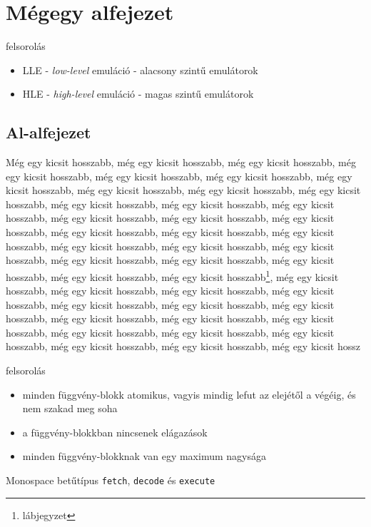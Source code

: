\documentclass[a4paper,oneside,onecolumn,12pt]{LegrandOrangeBook}
\begin{document}
\section{Mégegy alfejezet}

felsorolás

\begin{itemize}
    \item LLE - {\it low-level} emuláció - alacsony szintű emulátorok %
    \item HLE - {\it high-level} emuláció - magas szintű emulátorok %
\end{itemize}


\subsection{Al-alfejezet}

Még egy kicsit hosszabb, még egy kicsit hosszabb, még egy kicsit hosszabb, még egy kicsit hosszabb, még egy kicsit hosszabb, még egy kicsit hosszabb, még egy kicsit hosszabb, még egy kicsit hosszabb, még egy kicsit hosszabb, még egy kicsit hosszabb, még egy kicsit hosszabb, még egy kicsit hosszabb, még egy kicsit hosszabb, még egy kicsit hosszabb, még egy kicsit hosszabb, még egy kicsit hosszabb, még egy kicsit hosszabb, még egy kicsit hosszabb, még egy kicsit hosszabb, még egy kicsit hosszabb, még egy kicsit hosszabb, még egy kicsit hosszabb, még egy kicsit hosszabb, még egy kicsit hosszabb, még egy kicsit hosszabb, még egy kicsit hosszabb, még egy kicsit hosszabb\footnote{lábjegyzet}, még egy kicsit hosszabb, még egy kicsit hosszabb, még egy kicsit hosszabb, még egy kicsit hosszabb, még egy kicsit hosszabb, még egy kicsit hosszabb, még egy kicsit hosszabb, még egy kicsit hosszabb, még egy kicsit hosszabb, még egy kicsit hosszabb, még egy kicsit hosszabb, még egy kicsit hosszabb, még egy kicsit hosszabb, még egy kicsit hosszabb, még egy kicsit hosszabb, még egy kicsit hossz

felsorolás
\begin{itemize}
    \item minden függvény-blokk atomikus, vagyis mindig lefut az elejétől a végéig, és nem szakad meg soha
    \item a függvény-blokkban nincsenek elágazások
    \item minden függvény-blokknak van egy maximum nagysága
\end{itemize}


Monospace betűtípus \texttt{fetch}, \texttt{decode} és \texttt{execute}
\end{document}
